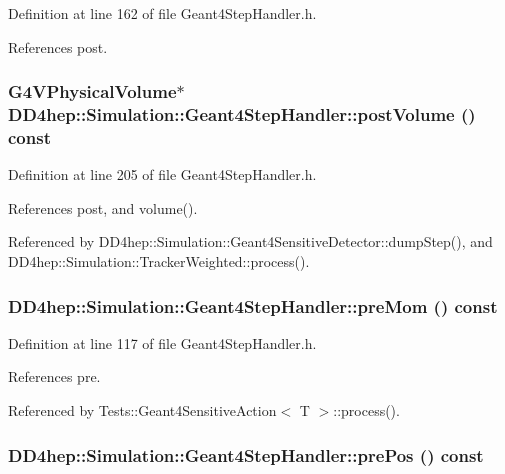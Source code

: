Definition at line 162 of file Geant4StepHandler.h.

References post.\hypertarget{class_d_d4hep_1_1_simulation_1_1_geant4_step_handler_a0d568a83cad6f9cb0a300c0426c551da}{
\subsubsection[{postVolume}]{\setlength{\rightskip}{0pt plus 5cm}G4VPhysicalVolume$\ast$ DD4hep::Simulation::Geant4StepHandler::postVolume () const}}
\label{class_d_d4hep_1_1_simulation_1_1_geant4_step_handler_a0d568a83cad6f9cb0a300c0426c551da}


Definition at line 205 of file Geant4StepHandler.h.

References post, and volume().

Referenced by DD4hep::Simulation::Geant4SensitiveDetector::dumpStep(), and DD4hep::Simulation::TrackerWeighted::process().\hypertarget{class_d_d4hep_1_1_simulation_1_1_geant4_step_handler_a3262383310d646a583768f7b408a2d94}{
\subsubsection[{preMom}]{ DD4hep::Simulation::Geant4StepHandler::preMom () const}}
\label{class_d_d4hep_1_1_simulation_1_1_geant4_step_handler_a3262383310d646a583768f7b408a2d94}


Definition at line 117 of file Geant4StepHandler.h.

References pre.

Referenced by Tests::Geant4SensitiveAction$<$ T $>$::process().\hypertarget{class_d_d4hep_1_1_simulation_1_1_geant4_step_handler_aaa60daae1bdca84d9dee8e7eb4585f75}{
\subsubsection[{prePos}]{ DD4hep::Simulation::Geant4StepHandler::prePos () const}}
\label{class_d_d4hep_1_1_simulation_1_1_geant4_step_handler_aaa60daae1bdca84d9dee8e7eb4585f75}



